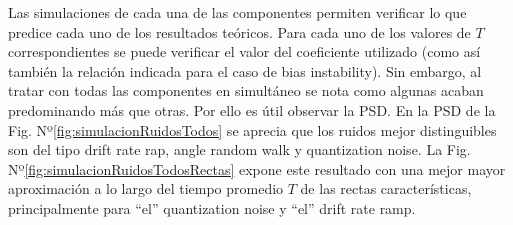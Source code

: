 \documentclass[a4paper,11pt,twoside]{IT-CNEA}
\begin{document}
\par Las simulaciones de cada una de las componentes permiten verificar lo que predice cada uno de los resultados teóricos. Para cada uno de los valores de $T$ correspondientes se puede verificar el valor del coeficiente utilizado (como así también la relación indicada para el caso de bias instability). Sin embargo, al tratar con todas las componentes en simultáneo se nota como algunas acaban predominando más que otras. Por ello es útil observar la PSD. En la PSD de la Fig. Nº\ref{fig:simulacionRuidosTodos} se aprecia que los ruidos mejor distinguibles son del tipo drift rate rap, angle random walk y quantization noise. La Fig. Nº\ref{fig:simulacionRuidosTodosRectas} expone este resultado con una mejor mayor aproximación  a lo largo del tiempo promedio $T$ de las rectas características, principalmente para ``el'' quantization noise y ``el'' drift rate ramp.
\end{document}
